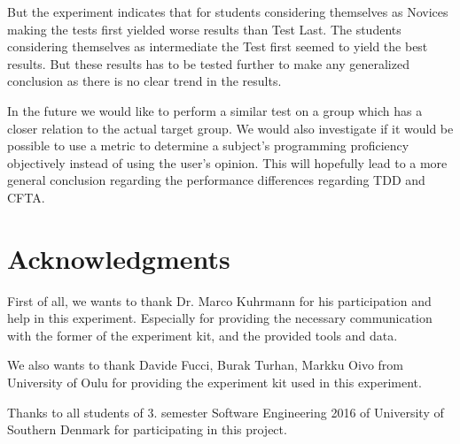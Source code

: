 \documentclass{sig-alternate-05-2015}
\begin{document}
But the experiment indicates that for students considering themselves as Novices making the tests first yielded worse results than Test Last. The students considering themselves as intermediate the Test first seemed to yield the best results. But these results has to be tested further to make any generalized conclusion as there is no clear trend in the results.

In the future we would like to perform a similar test on a group which has a closer relation to the actual target group. We would also investigate if it would be possible to use a metric to determine a subject's programming proficiency objectively instead of using the user's opinion. This will hopefully lead to a more general conclusion regarding the performance differences regarding TDD and CFTA.




\section{Acknowledgments}

First of all, we wants to thank Dr. Marco Kuhrmann for his participation and help in this experiment. Especially for providing the necessary communication with the former of the experiment kit, and the provided tools and data.

We also wants to thank Davide Fucci, Burak Turhan, Markku Oivo from University of Oulu for providing the experiment kit used in this experiment.

Thanks to all students of 3. semester Software Engineering 2016 of University of Southern Denmark for participating in this project.
\end{document}
